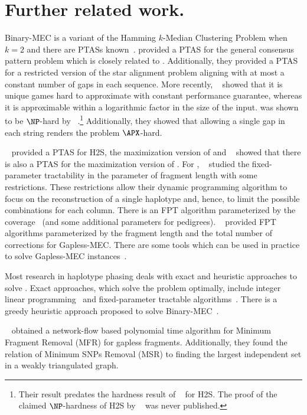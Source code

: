 \section{Further related work.}
Binary-MEC is a variant of the Hamming $k$-Median Clustering Problem when $k = 2$ and there are PTASs known~\cite{JXL04_k, OR02_polynomial}. 
\cite{LMW02_finding} provided a PTAS for the general consensus pattern problem which is closely related to \MEC.
Additionally, they provided a PTAS for a restricted version of the star alignment problem aligning with at most a constant number of gaps in each sequence.
More recently, ~\cite{BDK+16_minimum} showed that it is unique games hard to approximate \MEC with constant performance guarantee, whereas it is approximable within a logarithmic factor in the size of the input. 
\GMEC was shown to be $\NP$-hard by ~\cite{CIKT07_complexity}.\footnote{Their result predates the hardness result of ~\cite{Fei14_np} for H2S. The proof of the claimed $\NP$-hardness of H2S by ~\cite{KPR98_segmentation} was never published.}
Additionally, they showed that allowing a single gap in each string renders the problem $\APX$-hard.


~\cite{AS99_two} provided a PTAS for H2S, the maximization version of \BMEC and ~\cite{WUB13_monochromatic} showed that there is also a PTAS for the maximization version of \MEC.
For \GMEC, ~\cite{HCP+10_optimal} studied the fixed-parameter tractability in the parameter of fragment length with some restrictions.
These restrictions allow their dynamic programming algorithm to focus on the reconstruction of a single haplotype and, hence, to limit the possible combinations for each column.
There is an FPT algorithm parameterized by the coverage~\cite{PMP+15_whatshap,garg2016read} (and some additional parameters for pedigrees). 
~\cite{BDK+16_minimum} provided FPT algorithms parameterized by the fragment length and the total number of corrections for Gapless-MEC.
There are some tools which can be used in practice to solve Gapless-MEC instances~\cite{PZD+15_hapcol, PMP+15_whatshap}.

Most research in haplotype phasing deals with exact and heuristic approaches to solve \BMEC.
Exact approaches, which solve the problem optimally, include integer linear programming~\cite{FM12_solving} and fixed-parameter tractable algorithms~\cite{HCP+10_optimal, PZD+15_hapcol}.
There is a greedy heuristic approach proposed to solve Binary-MEC~\cite{BB08_hapcut}. 

~\cite{LBI+01_snps} obtained a network-flow based polynomial time algorithm for Minimum Fragment Removal (MFR) for gapless fragments.
Additionally, they found the relation of Minimum SNPs Removal (MSR) to finding the largest independent set in a weakly triangulated graph.

